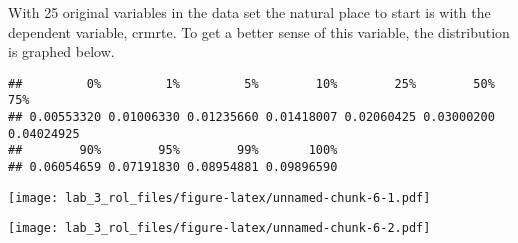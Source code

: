 \documentclass[
]{article}
\newenvironment{Shaded}{\begin{snugshade}}{\end{snugshade}}
\newcommand{\DataTypeTok}[1]{\textcolor[rgb]{0.13,0.29,0.53}{#1}}
\newcommand{\DecValTok}[1]{\textcolor[rgb]{0.00,0.00,0.81}{#1}}
\newcommand{\FloatTok}[1]{\textcolor[rgb]{0.00,0.00,0.81}{#1}}
\newcommand{\KeywordTok}[1]{\textcolor[rgb]{0.13,0.29,0.53}{\textbf{#1}}}
\newcommand{\NormalTok}[1]{#1}
\newcommand{\OperatorTok}[1]{\textcolor[rgb]{0.81,0.36,0.00}{\textbf{#1}}}
\newcommand{\StringTok}[1]{\textcolor[rgb]{0.31,0.60,0.02}{#1}}
\begin{document}
With 25 original variables in the data set the natural place to start is
with the dependent variable, crmrte. To get a better sense of this
variable, the distribution is graphed below.

\begin{Shaded}
\end{Shaded}

\begin{verbatim}
##         0%         1%         5%        10%        25%        50%        75% 
## 0.00553320 0.01006330 0.01235660 0.01418007 0.02060425 0.03000200 0.04024925 
##        90%        95%        99%       100% 
## 0.06054659 0.07191830 0.08954881 0.09896590
\end{verbatim}

\begin{Shaded}
\end{Shaded}

\texttt{[image: lab\_3\_rol\_files/figure-latex/unnamed-chunk-6-1.pdf]}

\begin{Shaded}
\end{Shaded}

\texttt{[image: lab\_3\_rol\_files/figure-latex/unnamed-chunk-6-2.pdf]}

\begin{Shaded}
\end{Shaded}
\end{document}

